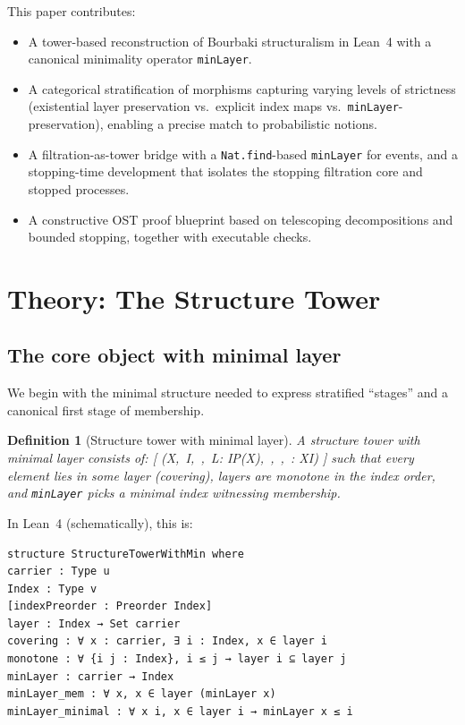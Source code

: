 \documentclass[11pt]{article}
\newtheorem{definition}{Definition}
\begin{document}
This paper contributes:

\begin{itemize}
\item A tower-based reconstruction of Bourbaki structuralism in Lean~4 with a canonical minimality operator \texttt{minLayer}. %
\item A categorical stratification of morphisms capturing varying levels of strictness (existential layer preservation vs.\ explicit index maps vs.\ \texttt{minLayer}-preservation), enabling a precise match to probabilistic notions. %
\item A filtration-as-tower bridge with a \texttt{Nat.find}-based \texttt{minLayer} for events, and a stopping-time development that isolates the stopping filtration core and stopped processes. %
\item A constructive OST proof blueprint based on telescoping decompositions and bounded stopping, together with executable checks.
\end{itemize}

\section{Theory: The Structure Tower}

\subsection{The core object with minimal layer}

We begin with the minimal structure needed to express stratified ``stages'' and a canonical first stage of membership.

\begin{definition}[Structure tower with minimal layer]
A \emph{structure tower with minimal layer} consists of:
[
(X,\ I,\ \le,\ L: I\to \mathcal P(X),\ ,\ ,\ \minLayer: X\to I)
]
such that every element lies in some layer (covering), layers are monotone in the index order, and \texttt{minLayer} picks a minimal index witnessing membership.
\end{definition}

In Lean~4 (schematically), this is:

\begin{lstlisting}[language={},caption={Lean skeleton: \texttt{StructureTowerWithMin}}]
structure StructureTowerWithMin where
carrier : Type u
Index : Type v
[indexPreorder : Preorder Index]
layer : Index → Set carrier
covering : ∀ x : carrier, ∃ i : Index, x ∈ layer i
monotone : ∀ {i j : Index}, i ≤ j → layer i ⊆ layer j
minLayer : carrier → Index
minLayer_mem : ∀ x, x ∈ layer (minLayer x)
minLayer_minimal : ∀ x i, x ∈ layer i → minLayer x ≤ i
\end{lstlisting}
\end{document}
